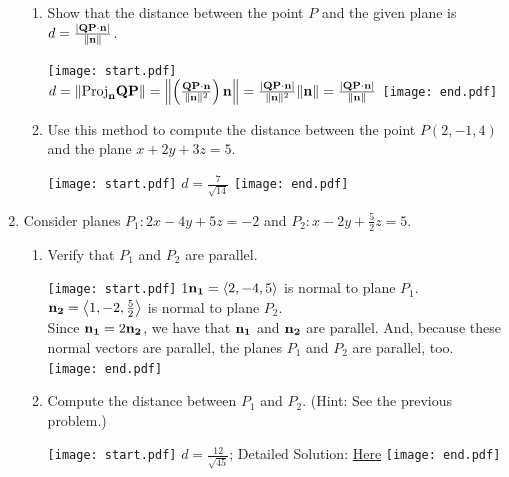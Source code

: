 \documentclass[12pt]{article}
\begin{document}
\begin{enumerate}
\begin{enumerate}

\item Show that the distance between the point $P$ and the given plane is $d=\frac{|{\bf QP}\cdot{\bf n}|}{\|{\bf n}\|}$.

\texttt{[image: start.pdf]}
{{$d=\left\|\text{Proj}_{\bf n}{\bf QP}\right\|=\left\|\left(\frac{{\bf QP}\cdot{\bf n}}{\|{\bf n}\|^2}\right){\bf n}\right\| =\frac{|{\bf QP}\cdot{\bf n}|}{\|{\bf n}\|^2}\|{\bf n}\|=\frac{|{\bf QP}\cdot {\bf n}|}{\|{\bf n}\|}$}}
\texttt{[image: end.pdf]}


\item Use this method to compute the distance between the point $P(2,-1,4)$ and the plane $x+2y+3z=5$.

\texttt{[image: start.pdf]}
{{$d=\frac{7}{\sqrt{14}}$}}
\texttt{[image: end.pdf]}


\end{enumerate}

\item Consider planes $P_1:2x-4y+5z=-2$ and $P_2:x-2y+\frac{5}{2}z=5$.

\begin{enumerate}

\item Verify that $P_1$ and $P_2$ are parallel.

\texttt{[image: start.pdf]}
{{{1\linewidth}{${\bf n_1}=\langle 2, -4, 5\rangle$ is normal to plane $P_1$.\\
${\bf n_2}=\left\langle 1, -2, \frac{5}{2}\right\rangle$ is normal to plane $P_2$.\\
Since ${\bf n_1}=2{\bf n_2}$, we have that ${\bf n_1}$ and ${\bf n_2}$ are parallel.  And, because these normal vectors are parallel, the planes $P_1$ and $P_2$ are parallel, too.}}}
\texttt{[image: end.pdf]}


\item Compute the distance between $P_1$ and $P_2$.  (Hint: See the previous problem.)

\texttt{[image: start.pdf]}
{{$d=\frac{12}{\sqrt{45}}$; Detailed Solution: \textcolor{blue}{\href{http://www.math.drexel.edu/classes/Calculus/resources/Math200HW/Solutions/06_200_Planes_18.pdf}{Here}}}}
\texttt{[image: end.pdf]}


\end{enumerate}

\end{enumerate}
\end{document}
